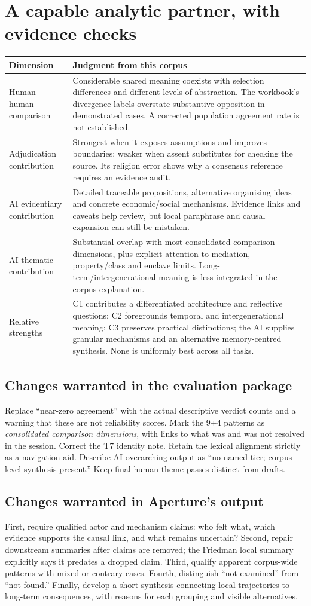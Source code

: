 \documentclass[10pt,a4paper]{article}
\newcommand{\kicker}[1]{{\sffamily\small\bfseries\color{teal}#1}\par\vspace{5pt}}
\newcommand{\page}[2]{\clearpage\kicker{#1}\section*{#2}}
\begin{document}
\page{12 / OVERALL ASSESSMENT}{A capable analytic partner, with evidence checks}
\begin{tabularx}{\linewidth}{@{}p{3.2cm}Y@{}}
\toprule
\textbf{Dimension} & \textbf{Judgment from this corpus}\tabularnewline\midrule
Human--human comparison & Considerable shared meaning coexists with selection differences and different levels of abstraction. The workbook's divergence labels overstate substantive opposition in demonstrated cases. A corrected population agreement rate is not established.\tabularnewline
Adjudication contribution & Strongest when it exposes assumptions and improves boundaries; weaker when assent substitutes for checking the source. Its religion error shows why a consensus reference requires an evidence audit.\tabularnewline
AI evidentiary contribution & Detailed traceable propositions, alternative organising ideas and concrete economic/social mechanisms. Evidence links and caveats help review, but local paraphrase and causal expansion can still be mistaken.\tabularnewline
AI thematic contribution & Substantial overlap with most consolidated comparison dimensions, plus explicit attention to mediation, property/class and enclave limits. Long-term/intergenerational meaning is less integrated in the corpus explanation.\tabularnewline
Relative strengths & C1 contributes a differentiated architecture and reflective questions; C2 foregrounds temporal and intergenerational meaning; C3 preserves practical distinctions; the AI supplies granular mechanisms and an alternative memory-centred synthesis. None is uniformly best across all tasks.\tabularnewline\bottomrule
\end{tabularx}

\subsection*{Changes warranted in the evaluation package}
Replace ``near-zero agreement'' with the actual descriptive verdict counts and a warning that these are not reliability scores. Mark the 9+4 patterns as \emph{consolidated comparison dimensions}, with links to what was and was not resolved in the session. Correct the T7 identity note. Retain the lexical alignment strictly as a navigation aid. Describe AI overarching output as ``no named tier; corpus-level synthesis present.'' Keep final human theme passes distinct from drafts.

\subsection*{Changes warranted in Aperture's output}
First, require qualified actor and mechanism claims: who felt what, which evidence supports the causal link, and what remains uncertain? Second, repair downstream summaries after claims are removed; the Friedman local summary explicitly says it predates a dropped claim. Third, qualify apparent corpus-wide patterns with mixed or contrary cases. Fourth, distinguish ``not examined'' from ``not found.'' Finally, develop a short synthesis connecting local trajectories to long-term consequences, with reasons for each grouping and visible alternatives.
\end{document}
